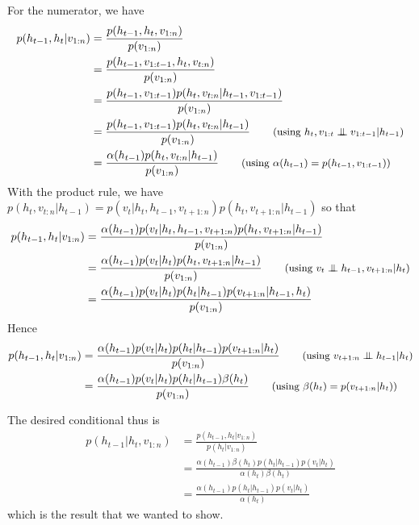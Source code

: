 \begin{exenumerate}
\begin{solution}
      For the numerator, we have
      \begin{align}
        p(h_{t-1},h_t | v_{1:n}) & =  \frac{p(h_{t-1},h_t, v_{1:n})}{p(v_{1:n})} \\
        & = \frac{p(h_{t-1}, v_{1:t-1}, h_t, v_{t:n})}{p(v_{1:n})} \\
        & = \frac{p(h_{t-1}, v_{1:t-1}) p(h_t, v_{t:n} | h_{t-1}, v_{1:t-1})}{p(v_{1:n})} \\
        & = \frac{p(h_{t-1}, v_{1:t-1}) p(h_t, v_{t:n} | h_{t-1})}{p(v_{1:n})} \quad \quad \text{\small (using $h_t, v_{1:t} \independent v_{1:t-1} | h_{t-1}$)}\\
        & = \frac{\alpha(h_{t-1}) p(h_t, v_{t:n} | h_{t-1})}{p(v_{1:n})} \quad \quad \text{\small (using $\alpha(h_{t-1}) = p(h_{t-1}, v_{1:t-1})$)}
      \end{align}
      With the product rule, we have  $p(h_t, v_{t:n} | h_{t-1}) =  p(v_t|h_t, h_{t-1}, v_{t+1:n}) p(h_t, v_{t+1:n} | h_{t-1})$ so that
      \begin{align}   
  p(h_{t-1},h_t | v_{1:n})& = \frac{\alpha(h_{t-1}) p(v_t|h_t, h_{t-1}, v_{t+1:n}) p(h_t, v_{t+1:n} | h_{t-1})}{p(v_{1:n})}\\
       & = \frac{\alpha(h_{t-1}) p(v_t|h_t) p(h_t, v_{t+1:n} | h_{t-1})}{p(v_{1:n})} \quad \quad \text{\small (using $v_t \independent h_{t-1}, v_{t+1:n} |h_t$)}\\
        & = \frac{\alpha(h_{t-1}) p(v_t|h_t) p(h_t | h_{t-1}) p(v_{t+1:n} | h_{t-1}, h_t)}{p(v_{1:n})} 
        \end{align}
        Hence
        \begin{align}
       p(h_{t-1},h_t | v_{1:n}) & = \frac{\alpha(h_{t-1}) p(v_t|h_t) p(h_t | h_{t-1}) p(v_{t+1:n} | h_t)}{p(v_{1:n})} \quad \quad \text{\small (using $v_{t+1:n} \independent h_{t-1} | h_t$)}\\
& = \frac{\alpha(h_{t-1}) p(v_t|h_t) p(h_t | h_{t-1}) \beta(h_t)}{p(v_{1:n})} \quad \quad \text{\small (using $\beta(h_t) = p(v_{t+1:n}|h_t)$)}
      \end{align}

      The desired conditional thus is
      \begin{align}
        p(h_{t-1} | h_t, v_{1:n}) & = \frac{p(h_{t-1}, h_t| v_{1:n})}{p(h_t|v_{1:n})} \\
        & = \frac{\alpha(h_{t-1}) \beta(h_t) p(h_t|h_{t-1}) p(v_t|h_t)}{\alpha(h_t) \beta(h_t)}\\
        & = \frac{\alpha(h_{t-1}) p(h_t|h_{t-1}) p(v_t|h_t)}{\alpha(h_t)}
      \end{align}
      which is the result that we wanted to show.
    \end{solution}


\end{exenumerate}
